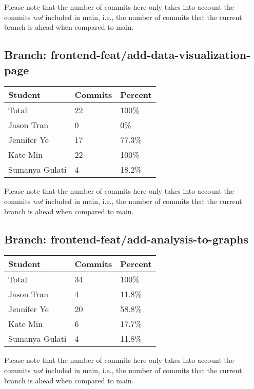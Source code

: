 \documentclass{article}
\begin{document}
Please note that the number of commits here only takes into account the commits \emph{not}
included in main, i.e., the number of commits that the current branch is ahead when compared 
to main.

\subsection{Branch: frontend-feat/add-data-visualization-page}

\begin{table}[H]
\centering
\begin{tabular}{lll}
\toprule
\textbf{Student} & \textbf{Commits} & \textbf{Percent}\\
\midrule
Total & 22 & 100\% \\
Jason Tran & 0 & 0\% \\
Jennifer Ye & 17 & 77.3\% \\
Kate Min & 22 & 100\% \\
Sumanya Gulati & 4 & 18.2\% \\
\bottomrule
\end{tabular}
\end{table}

Please note that the number of commits here only takes into account the commits \emph{not}
included in main, i.e., the number of commits that the current branch is ahead when compared 
to main.

\subsection{Branch: frontend-feat/add-analysis-to-graphs}

\begin{table}[H]
\centering
\begin{tabular}{lll}
\toprule
\textbf{Student} & \textbf{Commits} & \textbf{Percent}\\
\midrule
Total & 34 & 100\% \\
Jason Tran & 4 & 11.8\% \\
Jennifer Ye & 20 & 58.8\% \\
Kate Min & 6 & 17.7\% \\
Sumanya Gulati & 4 & 11.8\% \\
\bottomrule
\end{tabular}
\end{table}

Please note that the number of commits here only takes into account the commits \emph{not}
included in main, i.e., the number of commits that the current branch is ahead when compared 
to main.
\end{document}
